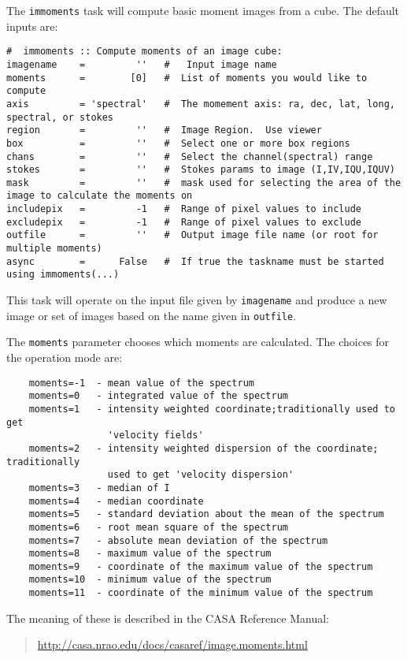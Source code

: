 The {\tt immoments} task will compute basic moment images from a cube.
The default inputs are:
\small
\begin{verbatim}
#  immoments :: Compute moments of an image cube:
imagename    =         ''   #   Input image name
moments      =        [0]   #  List of moments you would like to compute
axis         = 'spectral'   #  The momement axis: ra, dec, lat, long, spectral, or stokes
region       =         ''   #  Image Region.  Use viewer
box          =         ''   #  Select one or more box regions
chans        =         ''   #  Select the channel(spectral) range
stokes       =         ''   #  Stokes params to image (I,IV,IQU,IQUV)
mask         =         ''   #  mask used for selecting the area of the image to calculate the moments on
includepix   =         -1   #  Range of pixel values to include
excludepix   =         -1   #  Range of pixel values to exclude
outfile      =         ''   #  Output image file name (or root for multiple moments)
async        =      False   #  If true the taskname must be started using immoments(...)
\end{verbatim}
\normalsize

This task will operate on the input file given by {\tt imagename} and
produce a new image or set of images based on the name given in
{\tt outfile}.

The {\tt moments} parameter chooses which moments are calculated.
The choices for the operation mode are:
\small
\begin{verbatim}
    moments=-1  - mean value of the spectrum
    moments=0   - integrated value of the spectrum
    moments=1   - intensity weighted coordinate;traditionally used to get 
                  'velocity fields'
    moments=2   - intensity weighted dispersion of the coordinate; traditionally
                  used to get 'velocity dispersion'
    moments=3   - median of I
    moments=4   - median coordinate
    moments=5   - standard deviation about the mean of the spectrum
    moments=6   - root mean square of the spectrum
    moments=7   - absolute mean deviation of the spectrum
    moments=8   - maximum value of the spectrum
    moments=9   - coordinate of the maximum value of the spectrum
    moments=10  - minimum value of the spectrum
    moments=11  - coordinate of the minimum value of the spectrum
\end{verbatim}
\normalsize
The meaning of these is described in the CASA Reference Manual:
\begin{quote}
   \url{http://casa.nrao.edu/docs/casaref/image.moments.html}
\end{quote}

